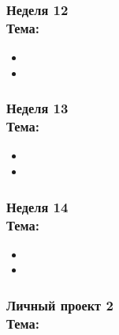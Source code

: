\documentclass[a4paper,11pt]{article}
\begin{document}
\subsubsection{Неделя 12\\ Тема: }

\begin{itemize}
    \item 
    \item 
\end{itemize}

\subsubsection{Неделя 13\\ Тема: }

\begin{itemize}
    \item 
    \item 
\end{itemize}

\subsubsection{Неделя 14\\ Тема: }

\begin{itemize}
    \item 
    \item 
\end{itemize}

\subsubsection{Личный проект 2\\ Тема: }
\end{document}
